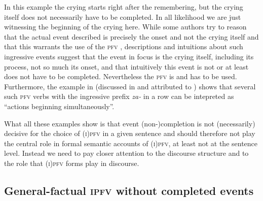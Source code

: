 \documentclass[output=paper]{langscibook}
\begin{document}
\label{gehr:ex:za}
\z 

\noindent In this example the crying starts right after the remembering, but the crying itself does not necessarily have to be completed. In all likelihood we are just witnessing the beginning of the crying here. While some authors try to reason that the actual event described is precisely the onset and not the crying itself and that this warrants the use of the \textsc{pfv} \citep[see, for instance,][]{ramchandlingua}, descriptions and intuitions about such ingressive events suggest that the event in focus is the crying itself, including its process, not so much its onset, and that intuitively this event is not or at least does not have to be completed. Nevertheless the \textsc{pfv} is and has to be used. Furthermore, the example in  (discussed in \citealt[][224]{dickey00} and attributed to \citealt{svedtrof83}) shows that several such \textsc{pfv} verbs with the ingressive prefix \textit{za-} in a row can be intepreted as ``actions beginning simultaneously''.

\label{gehr:ex:zasim}
\z

\noindent What all these examples show is that event (non-)completion is not (necessarily) decisive for the choice of \textsc{(i)pfv} in a given sentence and should therefore not play the central role in formal semantic accounts of \textsc{(i)pfv}, at least not at the sentence level. Instead we need to pay closer attention to the discourse structure and to the role that \textsc{(i)pfv} forms play in discourse. 

\subsection{General-factual \textsc{ipfv} without completed events}
\label{gehr:sec:OFnocompl}
\end{document}
